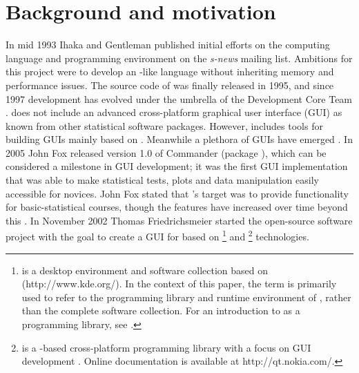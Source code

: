 \section{Background and motivation}
\label{background}
In mid 1993 Ihaka and Gentleman published initial efforts on the computing
language and programming environment  on the \emph{s-news} mailing list. Ambitions for
this project were to develop an -like language without inheriting memory
and performance issues. The source code of  was finally released in 1995, and 
since 1997 development has evolved under the umbrella of the  
Development Core Team \citep{RDCT2001, RDCT2010, Ihaka_Gentlemen_1993}.
 does not include an advanced cross-platform graphical user interface (GUI) as known from other
statistical software packages. However,  includes tools for building GUIs
mainly based on  \citep{Dalgaard2001, Dalgaard2002}. Meanwhile a
plethora of  GUIs have emerged \cite{RGUI}. In 2005 John Fox released version 1.0 of  Commander (package  \cite{Fox2005}), which
can be considered a milestone in  GUI development; it was the first GUI
implementation that was able to make statistical tests,
plots and data manipulation easily accessible for  novices.
John Fox stated that 's target was to provide
functionality for basic-statistical courses, though the features have increased over
time beyond this \citep{Fox2005, Fox2007}. In November 2002 Thomas Friedrichsmeier
started the  open-source software project with the goal to create a GUI for
 based on \footnote{
   is a desktop environment and software collection based on  (http://www.kde.org/).
  In the context of this paper, the term  is primarily used to refer to the programming library and
  runtime environment of , rather than the complete software collection. For an introduction to
   as a programming library, see \cite{Faure2000}.
} and \footnote{
   is a -based cross-platform programming library with a focus on GUI development
  \citep{BlanchetteSummerfield2008}. Online documentation is available at http://qt.nokia.com/.
} technologies.

